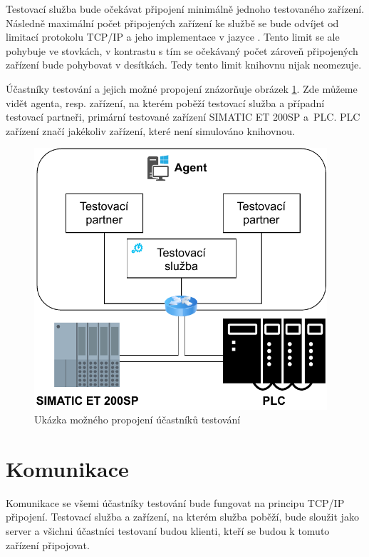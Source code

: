 Testovací služba bude očekávat připojení minimálně jednoho testovaného zařízení. Následně maximální počet připojených zařízení ke službě se bude odvíjet od limitací protokolu TCP/IP a jeho implementace v jazyce \csharp{}. Tento limit se ale pohybuje ve stovkách, v kontrastu s tím se očekávaný počet zároveň připojených zařízení bude pohybovat v desítkách. Tedy tento limit knihovnu nijak neomezuje.

Účastníky testování a jejich možné propojení znázorňuje obrázek \ref{fig:devicemodel}. Zde můžeme vidět agenta, resp. zařízení, na kterém poběží testovací služba a případní testovací partneři, primární testované zařízení SIMATIC ET 200SP a~PLC. PLC zařízení značí jakékoliv zařízení, které není simulováno knihovnou.

\begin{figure}[htbp]
    \centering 
    \includegraphics[width=0.97\textwidth]{assets/img/devicemodel.pdf}
    \caption{Ukázka možného propojení účastníků testování}
    \label{fig:devicemodel}
\end{figure}

\section{Komunikace}\label{sec:communication}
Komunikace se všemi účastníky testování bude fungovat na principu TCP/IP připojení. Testovací služba a zařízení, na kterém služba poběží, bude sloužit jako server a všichni účastníci testovaní budou klienti, kteří se budou k tomuto zařízení připojovat. 

